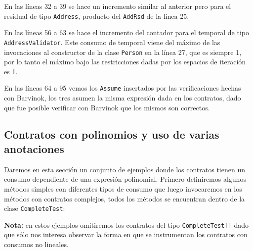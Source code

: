 \documentclass[12pt,a4paper]{article}
\newcommand\mono[1]{\texttt{#1}}
\begin{document}
			En las líneas 32 a 39 se hace un incremento similar al anterior pero para el residual de tipo \mono{Address}, producto del \mono{AddRsd} de la línea 25.

			En las líneas 56 a 63 se hace el incremento del contador para el temporal de tipo \mono{AddressValidator}. Este consumo de temporal viene del máximo de las invocaciones al constructor de la clase \mono{Person} en la línea 27, que es siempre 1, por lo tanto el máximo bajo las restricciones dadas por los espacios de iteración es 1.

			En las líneas 64 a 95 vemos los \mono{Assume} insertados por las verificaciones hechas con Barvinok, los tres asumen la misma expresión dada en los contratos, dado que fue posible verificar con Barvinok que los mismos son correctos.
		\subsection{Contratos con polinomios y uso de varias anotaciones}
			Daremos en esta sección un conjunto de ejemplos donde los contratos tienen un consumo dependiente de una expresión polinomial. Primero definiremos algunos métodos simples con diferentes tipos de consumo que luego invocaremos en los métodos con contratos complejos, todos los métodos se encuentran dentro de la clase \mono{CompleteTest}:

			\textbf{Nota:} en estos ejemplos omitiremos los contratos del tipo \mono{CompleteTest[]} dado que sólo nos interesa observar la forma en que se instrumentan los contratos con consumos no lineales.
\end{document}
